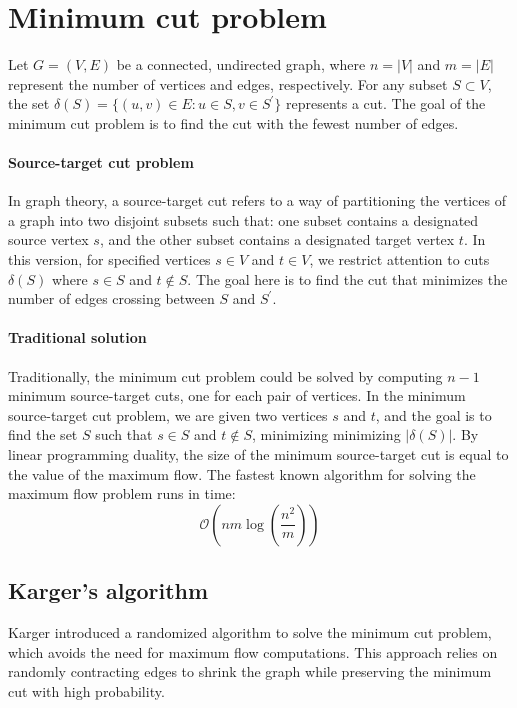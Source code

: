 \section{Minimum cut problem}

Let $G = (V, E)$ be a connected, undirected graph, where $n = |V|$ and $m = |E|$ represent the number of vertices and edges, respectively. 
For any subset $S \subset V$, the set $\delta(S) = \{(u, v) \in E : u \in S, v \in S^\prime\}$ represents a cut. 
The goal of the minimum cut problem is to find the cut with the fewest number of edges.

\paragraph*{Source-target cut problem}
In graph theory, a source-target cut refers to a way of partitioning the vertices of a graph into two disjoint subsets such that: one subset contains a designated source vertex $s$, and the other subset contains a designated target vertex $t$.
In this version, for specified vertices $s \in V$ and $t \in V$, we restrict attention to cuts $\delta(S)$ where $s \in S$ and $t \notin S$. 
The goal here is to find the cut that minimizes the number of edges crossing between $S$ and $S^\prime$.

\paragraph*{Traditional solution}
Traditionally, the minimum cut problem could be solved by computing $n-1$ minimum source-target cuts, one for each pair of vertices.
In the minimum source-target cut problem, we are given two vertices $s$ and $t$, and the goal is to find the set $S$ such that $s \in S$ and $t \notin S$, minimizing minimizing $|\delta(S)|$.
By linear programming duality, the size of the minimum source-target cut is equal to the value of the maximum flow. 
The fastest known algorithm for solving the maximum flow problem runs in time: 
\[\mathcal{O}\left(nm \log\left(\frac{n^2}{m}\right)\right)\]

\subsection{Karger's algorithm}
Karger introduced a randomized algorithm to solve the minimum cut problem, which avoids the need for maximum flow computations.
This approach relies on randomly contracting edges to shrink the graph while preserving the minimum cut with high probability.

